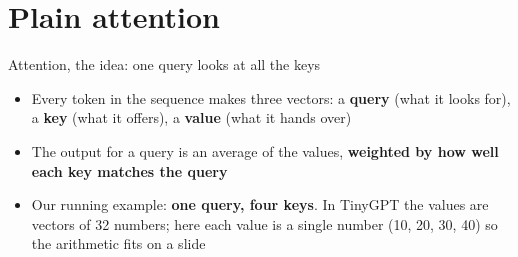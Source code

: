 \documentclass[aspectratio=169,11pt]{beamer}
\begin{document}
\section{Plain attention}
\begin{frame}{Attention, the idea: one query looks at all the keys}
\centering
{}
\vspace{3mm}
\begin{itemize}\small
\item Every token in the sequence makes three vectors: a \textbf{query} (what it looks for), a \textbf{key} (what it offers), a \textbf{value} (what it hands over)
\item The output for a query is an average of the values, \textbf{weighted by how well each key matches the query}
\item Our running example: \textbf{one query, four keys}. In TinyGPT the values are vectors of 32 numbers; here each value is a single number (10, 20, 30, 40) so the arithmetic fits on a slide
\end{itemize}
\end{frame}
\end{document}
